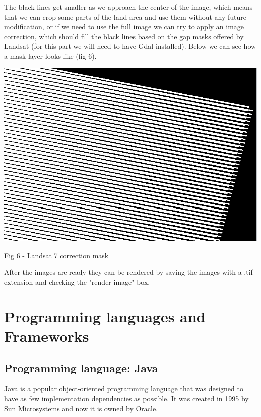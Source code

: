 \documentclass[12pt, a4paper]{report}
\begin{document}
\quad
The black lines get smaller as we approach the center of the image, which means that we can crop some parts of the land area and use them without any future modification, or if we need to use the full image we can try to apply an image correction, which should fill the black lines based on the gap masks offered by Landsat (for this part we will need to have Gdal installed). Below we can see how a mask layer looks like (fig 6).
\par 


\bigskip

\includegraphics[scale=0.54, center]{landsat_black_stripes_correction.png} 
\begin{center}
Fig 6 - Landsat 7 correction mask
\end{center}
\par 

After the images are ready they can be rendered by saving the images with a .tif extension and checking the "render image" box.



\section{Programming languages and Frameworks} 

\subsection{Programming language: Java}
\medskip

\quad
Java is a popular object-oriented programming language that was designed to have as few implementation dependencies as possible. It was created in 1995 by Sun Microsystems and now it is owned by Oracle.
\par
\end{document}
